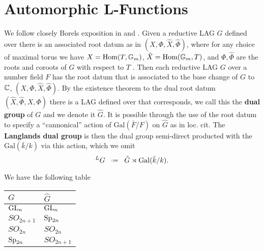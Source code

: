 \section{Automorphic L-Functions}
We follow closely Borels exposition in \cite[Part 2. III. 2. ]{borelAutomorphicFormsRepresentations} and \cite{shahidiEisensteinSeriesAutomorphic2010}.
Given a reductive LAG \(G\) defined over \C there is an associated root datum as in \((X, \Phi, \hat{X}, \hat{\Phi})\), where for any choice of maximal torus we have \(X = \operatorname{Hom}(T, \mathbb{G}_m)\), \(\hat{X} = \operatorname{Hom}(\mathbb{G}_m, T)\), and \(\Phi, \hat\Phi\) are the roots and coroots of \(G\) with respect to \(T\) \cite[7.4.3]{springerLinearAlgebraicGroups1998}.  Then each reductive LAG \(G\) over a number field \(F\) has the root datum that is associated to the base change of \(G\) to \(\C\), \((X, \Phi, \hat{X}, \hat{\Phi})\).
By the existence theorem \cite[10]{springerLinearAlgebraicGroups1998} to the dual root datum \(( \hat{X}, \hat{\Phi}, X, \Phi)\) there is a LAG defined over \C that corresponds, we call this the \textbf{dual group} of \(G\) and we denote it \(\hat{G}\). It is possible through the use of the root datum to specify a ``cannonical'' action of \(\mathrm{Gal}(\bar{F}/F)\) on \(\hat{G}\) as in loc. cit.
The \textbf{Langlands dual group} is then the dual group semi-direct producted with the \(\mathrm{Gal}(\bar{k}/k)\) via this action, which we omit
\[^L G \defeq \hat{G} \rtimes \mathrm{Gal}(\bar{k}/k).\]

\begin{example}
	We have the following table
	\begin{table}[h]
		\centering
		\begin{tabular}{ll}
			\(G\)         & \(\hat{G}\)   \\ \hline
			\(\operatorname{GL}_n\)     & \(\operatorname{GL}_n\)     \\
			\(SO_{2n+1}\) & \(\operatorname{Sp}_{2n}\)  \\
			\(SO_{2n}\)   & \(SO_{2n}\)   \\
			\(\operatorname{Sp}_{2n}\)  & \(SO_{2n+1}\)
		\end{tabular}
	\end{table}
\end{example}


